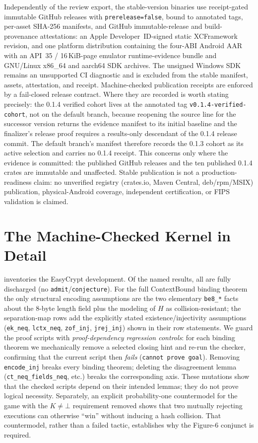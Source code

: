 \documentclass[journal]{IEEEtran}
\newcommand{\code}[1]{\texttt{\small #1}}
\newcommand{\K}{\ensuremath{K}}
\begin{document}
Independently of the review export, the stable-version binaries use receipt-gated immutable
GitHub releases with \code{prerelease=false}, bound to annotated tags, per-asset SHA-256 manifests, and GitHub
immutable-release and build-provenance attestations: an Apple Developer~ID-signed static
XCFramework revision, and one platform distribution containing the four-ABI Android AAR with an
API~35 / 16\,KiB-page emulator runtime-evidence bundle and GNU/Linux x86\_64 and aarch64 SDK
archives. The unsigned Windows SDK remains an unsupported CI diagnostic and is excluded
from the stable manifest, assets, attestation, and receipt. Machine-checked publication
receipts are enforced by a fail-closed release contract. Where they are recorded is worth
stating precisely: the 0.1.4 verified cohort lives at the annotated tag
\code{v0.1.4-verified-cohort}, not on the default branch, because reopening the source line for
the successor version returns the evidence manifest to its initial baseline and the finalizer's
release proof requires a results-only descendant of the 0.1.4 release commit. The default
branch's manifest therefore records the 0.1.3 cohort as its active selection and carries no 0.1.4
receipt. This concerns only where the evidence is committed: the published GitHub releases and
the ten published 0.1.4 crates are immutable and unaffected.
Stable publication is not a production-readiness claim: no unverified registry
(crates.io, Maven Central, deb/rpm/MSIX) publication, physical-Android coverage, independent
certification, or FIPS validation is claimed.

\section{The Machine-Checked Kernel in Detail}\label{app:kernel}
 inventories the EasyCrypt development. Of the named results, all are fully
discharged (no \code{admit}/\code{conjecture}). For the full ContextBound binding theorem the only
structural encoding assumptions are the two elementary \code{be8\_*} facts about the 8-byte length
field plus the modeling of $H$ as collision-resistant; the separation-map rows add the explicitly
stated existence/injectivity assumptions (\code{ek\_neq}, \code{lctx\_neq}, \code{zof\_inj},
\code{jrej\_inj}) shown in their row statements.
We guard the proof scripts with \emph{proof-dependency regression controls}: for each
binding theorem we mechanically remove a selected closing hint and re-run the checker, confirming
that the current script then \emph{fails} (\code{cannot prove goal}). Removing
\code{encode\_inj} breaks every binding theorem; deleting the disagreement lemma
(\code{ct\_neq\_fields\_neq}, etc.) breaks the corresponding axis. These mutations show that the
checked scripts depend on their intended lemmas; they do not prove logical necessity. Separately, an
explicit probability-one countermodel for the game with the $\K\neq\bot$ requirement removed shows
that two mutually rejecting executions can otherwise ``win'' without inducing a hash collision.
That countermodel, rather than a failed tactic, establishes why the Figure-6 conjunct is required.
\end{document}
